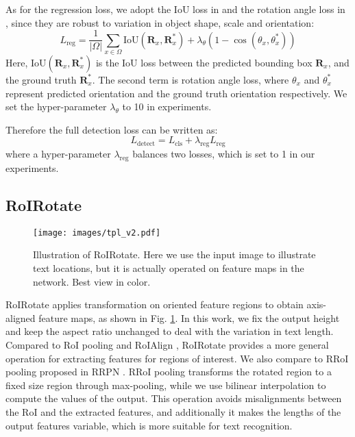 \documentclass[10pt,twocolumn,letterpaper]{article}
\begin{document}
As for the regression loss, we adopt the IoU loss in \cite{yu2016unitbox} and the rotation angle loss in \cite{zhou2017east}, since they are robust to variation in object shape, scale and orientation:
\begin{equation}
L_{\text{reg}} = \frac{1}{|\Omega|} \sum_{x \in \Omega} \text{IoU}(\mathbf{R}_x, \mathbf{R}_x^*) + \lambda_{\theta}(1-\cos(\theta_x, \theta_x^*)) \label{reg}
\end{equation}
Here, $\text{IoU}(\mathbf{R}_x, \mathbf{R}_x^*)$ is the IoU loss between the predicted bounding box $\mathbf{R}_x$, and the ground truth $\mathbf{R}_x^*$. The second term is rotation angle loss, where $\theta_x$ and $\theta_x^*$ represent predicted orientation and the ground truth orientation respectively. We set the hyper-parameter $\lambda_{\theta}$ to 10 in experiments.

Therefore the full detection loss can be written as:
\begin{equation}
L_{\text{detect}} = L_{\text{cls}} + \lambda_{\text{reg}}L_{\text{reg}} \label{L_detect}
\end{equation}
where a hyper-parameter $\lambda_{\text{reg}}$ balances two losses, which is set to 1 in our experiments.

\subsection{RoIRotate}
\label{tpl}

\begin{figure}
\centering
\texttt{[image: images/tpl\_v2.pdf]}
\vspace{5pt}
\caption{Illustration of RoIRotate. Here we use the input image to illustrate text locations, but it is actually operated on feature maps in the network. Best view in color.}
\label{fig:tpl}
\end{figure}

RoIRotate applies transformation on oriented feature regions to obtain axis-aligned feature maps, as shown in Fig. \ref{fig:tpl}. In this work, we fix the output height and keep the aspect ratio unchanged to deal with the variation in text length. Compared to RoI pooling \cite{girshick2015fast} and RoIAlign \cite{he2017mask}, RoIRotate provides a more general operation for extracting features for regions of interest. We also compare to RRoI pooling proposed in RRPN \cite{ma2017rcnn}. RRoI pooling transforms the rotated region to a fixed size region through max-pooling, while we use bilinear interpolation to compute the values of the output. This operation avoids misalignments between the RoI and the extracted features, and additionally it makes the lengths of the output features variable, which is more suitable for text recognition.
\end{document}

